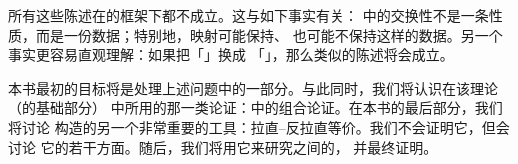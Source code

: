 所有这些陈述在\trInfinityCategories{}的框架下都不成立。这与如下事实有关：%
\trInfinityCategories{}中的交换性不是一条性质，而是一份数据；特别地，映射可能保持、%
也可能不保持这样的数据。另一个事实更容易直观理解：如果把「\trConnected{}」换成%
「\trContractible{}」，那么类似的陈述将会成立。

本书最初的目标将是处理上述问题中的一部分。与此同时，我们将认识在该理论（的基础部分）%
中所用的那一类论证：\trSimplicialSets{}中的组合论证。在本书的最后部分，我们将讨论%
构造\trFunctor{}的另一个非常重要的工具：拉直--反拉直等价。我们不会证明它，但会讨论%
它的若干方面。随后，我们将用它来研究\trInfinityCategories{}之间的\trAdjunction{}，
并最终证明\trAdjointFunctorTheorem{}。
